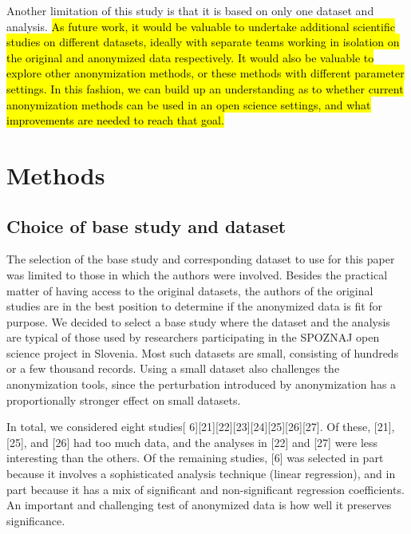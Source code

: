 \documentclass[10pt]{article}
\newcommand{\mycite}[1]{[#1]}
\begin{document}
Another limitation of this study is that it is based on only one dataset and analysis. \hl{As future work, it would be valuable to undertake additional scientific studies on different datasets, ideally with separate teams working in isolation on the original and anonymized data respectively. It would also be valuable to explore other anonymization methods, or these methods with different parameter settings. In this fashion, we can build up an understanding as to whether current anonymization methods can be used in an open science settings, and what improvements are needed to reach that goal.}



\section*{Methods}

\subsection*{Choice of base study and dataset}
\label{sec:base-study}

The selection of the base study and corresponding dataset to use for this paper was limited to those in which the authors were involved. Besides the practical matter of having access to the original datasets, the authors of the original studies are in the best position to determine if the anonymized data is fit for purpose. We decided to select a base study where the dataset and the analysis are typical of those used by researchers participating in the SPOZNAJ open science project in Slovenia. Most such datasets are small, consisting of hundreds or a few thousand records. Using a small dataset also challenges the anonymization tools, since the perturbation introduced by anonymization has a proportionally stronger effect on small datasets.

In total, we considered eight studies\mycite{
6}\mycite{21}\mycite{22}\mycite{23}\mycite{24}\mycite{25}\mycite{26}\mycite{27}. Of these, \mycite{21}, \mycite{25}, and \mycite{26} had too much data, and the analyses in \mycite{22} and \mycite{27} were less interesting than the others. Of the remaining studies, \mycite{6} was selected in part because it involves a sophisticated analysis technique (linear regression), and in part because it has a mix of significant and non-significant regression coefficients. An important and challenging test of  anonymized data is how well it preserves significance.
\end{document}
